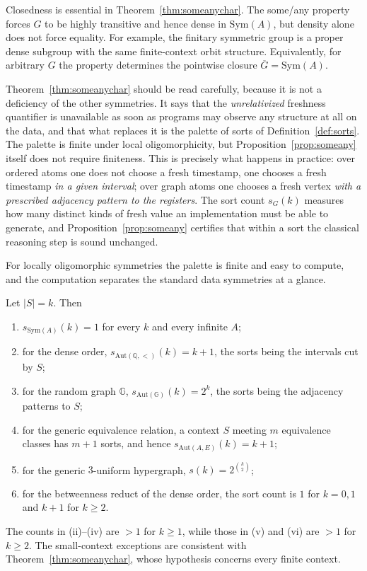 \documentclass{lmcs}
\newcommand{\Sym}{\mathrm{Sym}}
\newcommand{\Aut}{\mathrm{Aut}}
\begin{document}
Closedness is essential in Theorem~\ref{thm:someanychar}. The some/any
property forces $G$ to be highly transitive and hence dense in $\Sym(A)$,
but density alone does not force equality. For example, the finitary
symmetric group is a proper dense subgroup with the same finite-context orbit
structure. Equivalently, for arbitrary $G$ the property determines the
pointwise closure $\overline G=\Sym(A)$.

\begin{rem}\label{rem:someanyreading}
Theorem~\ref{thm:someanychar} should be read carefully, because it is
not a deficiency of the other symmetries. It says that the \emph{unrelativized}
freshness quantifier is unavailable as soon as programs may observe any
structure at all on the data, and that what replaces it is the palette
of sorts of Definition~\ref{def:sorts}. The palette is finite under
local oligomorphicity, but Proposition~\ref{prop:someany} itself does
not require finiteness. This is precisely what
happens in practice: over ordered atoms one does not choose a fresh
timestamp, one chooses a fresh timestamp \emph{in a given interval}; over
graph atoms one chooses a fresh vertex \emph{with a prescribed adjacency
pattern to the registers}. The sort count $s_G(k)$ measures how many
distinct kinds of fresh value an implementation must be able to
generate, and Proposition~\ref{prop:someany} certifies that within a
sort the classical reasoning step is sound unchanged.
\end{rem}

For locally oligomorphic symmetries the palette is finite and easy to
compute, and the computation separates the standard data symmetries at a
glance.

\begin{prop}\label{prop:sortcounts}
Let $|S|=k$. Then
\begin{enumerate}[label=\textup{(\roman*)}]
\item $s_{\Sym(A)}(k)=1$ for every $k$ and every infinite $A$;
\item for the dense order, $s_{\Aut(\mathbb Q,<)}(k)=k+1$, the sorts
being the intervals cut by $S$;
\item for the random graph $\mathbb G$,
$s_{\Aut(\mathbb G)}(k)=2^{k}$, the sorts being the adjacency patterns
to $S$;
\item for the generic equivalence relation, a context $S$ meeting $m$
equivalence classes has $m+1$ sorts, and hence
$s_{\Aut(A,E)}(k)=k+1$;
\item for the generic $3$-uniform hypergraph,
$s(k)=2^{\binom{k}{2}}$;
\item for the betweenness reduct of the dense order,
the sort count is $1$ for $k=0,1$ and $k+1$ for $k\geq2$.
\end{enumerate}
The counts in \textup{(ii)--(iv)} are $>1$ for $k\geq1$, while those
in \textup{(v)} and \textup{(vi)} are $>1$ for $k\geq2$. The
small-context exceptions are consistent with
Theorem~\ref{thm:someanychar}, whose hypothesis concerns every finite
context.
\end{prop}
\end{document}
